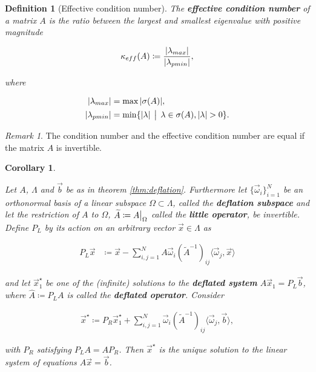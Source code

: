 \documentclass{article}
\newcommand\restr[2]{{%
  \left.\kern-\nulldelimiterspace %
  #1 %
  \vphantom{\big|} %
  \right|_{#2} %
  }
}
\theoremstyle{plain} %
\newtheorem{corollary}[theorem]{Corollary}
\newtheorem{definition}{Definition}[section]
\theoremstyle{convention} %
\theoremstyle{remark} %
\newtheorem*{remark}{Remark} %
\def\df#1{\textbf{\textit{#1}}}
\numberwithin{equation}{section}
\begin{document}
\begin{definition}[Effective condition number]

The \df{effective condition number} of a matrix $A$ is the ratio between the largest and smallest eigenvalue with positive magnitude

\begin{align*}
  \kappa_{eff}(A) &\coloneqq \frac{\abs{\lambda_{max}}}{\abs{\lambda_{pmin}}}, \\
\end{align*}

where

\begin{align*}
  \abs{\lambda_{max}} &= \max \abs{\sigma(A)}, \\
  \abs{\lambda_{pmin}} &= \min \{ \abs{\lambda} \, \bigm\lvert \, \lambda \in \sigma(A), \abs{\lambda} > 0 \}.
\end{align*}

\end{definition}

\begin{remark}
The condition number and the effective condition number are equal if the matrix $A$ is invertible.
\end{remark}

\begin{corollary}

\label{cor:deflation}

Let $A$, $\Lambda$ and $\vec{b}$ be as in theorem \ref{thm:deflation}. Furthermore let $\{ \vec{\omega}_i \}_{i=1}^N$ be an orthonormal basis of a linear subspace $\Omega \subset \Lambda$, called the \df{deflation subspace} and let the restriction of $A$ to $\Omega$, $\widetilde{A} \coloneqq \restr{A}{\Omega}$ called the \df{little operator}, be invertible. Define $P_L$ by its action on an arbitrary vector $\vec{x} \in \Lambda$ as

\begin{align*}
    P_L \vec{x} &\coloneqq \vec{x} - \sum_{i,j=1}^N A \vec{\omega}_i (\widetilde{A}^{-1})_{ij} \langle \vec{\omega}_j, \vec{x} \rangle
\end{align*}

and let $\vec{x}^{\star}_1$ be one of the (infinite) solutions to the \df{deflated system} $\hat{A} \vec{x}_1 = P_L \vec{b}$, where $\hat{A} \coloneqq P_L A$ is called the \df{deflated operator}. Consider

\begin{align}
    \vec{x}^{\star} \coloneqq P_R \vec{x}^{\star}_1 + \sum_{i,j=1}^N \vec{\omega}_i (\widetilde{A}^{-1})_{ij} \langle \vec{\omega}_j, \vec{b} \rangle, \label{eq:defl_soln}
\end{align}

with $P_R$ satisfying $P_L A = A P_R$. Then $\vec{x}^{\star}$ is the unique solution to the linear system of equations $A \vec{x} = \vec{b}$.

\end{corollary}
\end{document}
